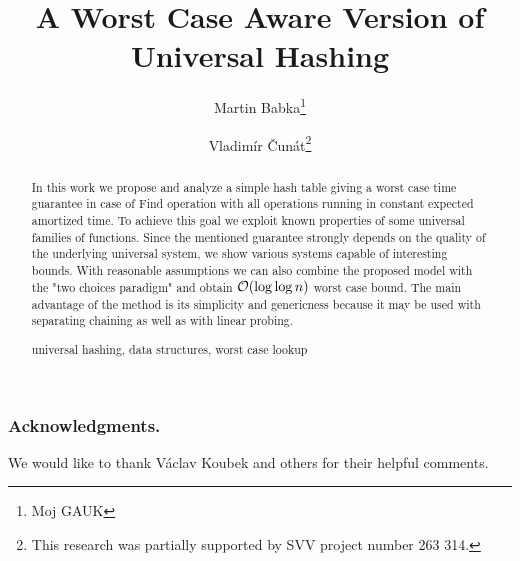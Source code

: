 \documentclass[runningheads,a4paper]{llncs}
\newcommand{\keywords}[1]{\par\addvspace\baselineskip
\noindent\keywordname\enspace\ignorespaces#1}
\begin{document}
\mainmatter

\author{Martin Babka\thanks{Moj GAUK} \and Vladimír Čunát\thanks{This research was partially supported by SVV project number 263 314.}}

\title{A Worst Case Aware Version of Universal Hashing}


\maketitle

\begin{abstract}
In this work we propose and analyze a simple hash table giving a worst case time guarantee in case of Find operation with all operations running in constant expected amortized time.
To achieve this goal we exploit known properties of some universal families of functions.
Since the mentioned guarantee strongly depends on the quality of the underlying universal system, we show various systems capable of interesting bounds.
With reasonable assumptions we can also combine the proposed model with the "two choices paradigm" and obtain $\mathcal{O}(\log \log n)$ worst case bound.
The main advantage of the method is its simplicity and genericness because it may be used with separating chaining as well as with linear probing.

\keywords{universal hashing, data structures, worst case lookup}
\end{abstract}






\subsubsection*{Acknowledgments.}
We would like to thank Václav Koubek and others for their helpful comments.



\clearpage


\end{document}
